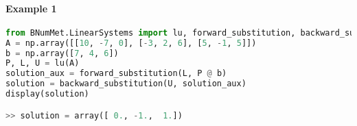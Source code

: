 \paragraph{Example 1}{
\begin{lstlisting}[language=Python]
from BNumMet.LinearSystems import lu, forward_substitution, backward_substitution
A = np.array([[10, -7, 0], [-3, 2, 6], [5, -1, 5]])
b = np.array([7, 4, 6])
P, L, U = lu(A)
solution_aux = forward_substitution(L, P @ b)
solution = backward_substitution(U, solution_aux)
display(solution)

>> solution = array([ 0., -1.,  1.])
\end{lstlisting}
}
